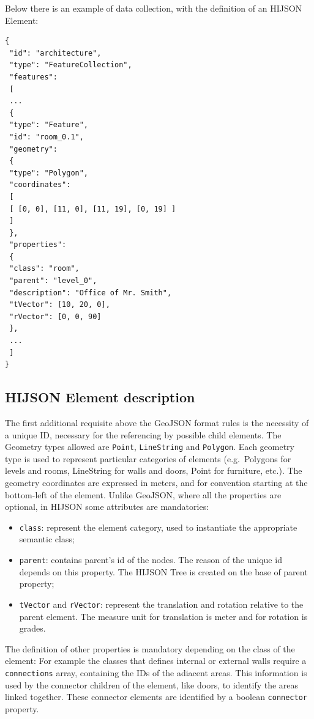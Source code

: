 \documentclass{sig-alternate}
\begin{document}
Below there is an example of data collection, with the definition of an HIJSON Element:

\begin{verbatim}
{
 "id": "architecture",
 "type": "FeatureCollection",
 "features": 
 [
 ...
 {
 "type": "Feature",
 "id": "room_0.1",
 "geometry": 
 {
 "type": "Polygon",
 "coordinates": 
 [ 
 [ [0, 0], [11, 0], [11, 19], [0, 19] ]
 ]
 },
 "properties": 
 {
 "class": "room",
 "parent": "level_0",
 "description": "Office of Mr. Smith",
 "tVector": [10, 20, 0],
 "rVector": [0, 0, 90]
 },
 ...
 ]
}
\end{verbatim}

\subsection{HIJSON Element description}

The first additional requisite above the GeoJSON format rules is the
necessity of a unique ID, necessary for the referencing by possible
child elements. The Geometry types allowed are \texttt{Point},
\texttt{LineString} and \texttt{Polygon}. Each geometry type is used to
represent particular categories of elements (e.g.~Polygons for levels
and rooms, LineString for walls and doors, Point for furniture, etc.).
The geometry coordinates are expressed in meters, and for convention
starting at the bottom-left of the element. Unlike GeoJSON, where all
the properties are optional, in HIJSON some attributes are mandatories:

\begin{itemize}
\itemsep1pt\parskip0pt
\item
 \texttt{class}: represent the element category, used to instantiate
 the appropriate semantic class;
\item
 \texttt{parent}: contains parent's id of the nodes. The reason of the
 unique id depends on this property. The HIJSON Tree is created on the
 base of parent property;
\item
 \texttt{tVector} and \texttt{rVector}: represent the translation and
 rotation relative to the parent element. The measure unit for
 translation is meter and for rotation is grades.
\end{itemize}

The definition of other properties is mandatory depending on the class
of the element: For example the classes that defines internal or
external walls require a \texttt{connections} array, containing the IDs
of the adiacent areas. This information is used by the connector
children of the element, like doors, to identify the areas linked
together. These connector elements are identified by a
boolean \texttt{connector} property.
\end{document}
